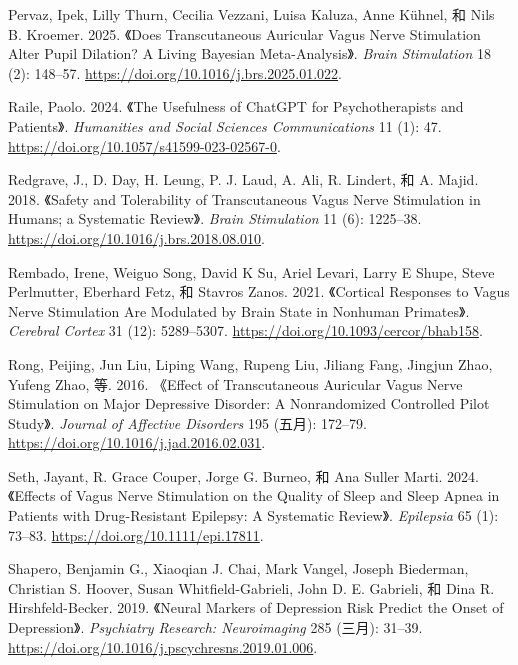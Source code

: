 \documentclass[
  Letterpaper,
]{scrbook}
\newlength{\cslhangindent}
\newenvironment{CSLReferences}[2] %
 {\begin{list}{}{%
  \setlength{\itemindent}{0pt}
  \setlength{\leftmargin}{0pt}
  \setlength{\parsep}{0pt}
  \ifodd #1
   \setlength{\leftmargin}{\cslhangindent}
   \setlength{\itemindent}{-1\cslhangindent}
  \fi
  \setlength{\itemsep}{#2\baselineskip}}}
 {\end{list}}
\begin{document}
\begin{CSLReferences}{1}{0}
Pervaz, Ipek, Lilly Thurn, Cecilia Vezzani, Luisa Kaluza, Anne Kühnel,
和 Nils B. Kroemer. 2025. {《Does Transcutaneous Auricular Vagus Nerve
Stimulation Alter Pupil Dilation? {A} Living {Bayesian}
Meta-Analysis》}. \emph{Brain Stimulation} 18 (2): 148--57.
\url{https://doi.org/10.1016/j.brs.2025.01.022}.

Raile, Paolo. 2024. {《The Usefulness of {ChatGPT} for Psychotherapists
and Patients》}. \emph{Humanities and Social Sciences Communications} 11
(1): 47. \url{https://doi.org/10.1057/s41599-023-02567-0}.

Redgrave, J., D. Day, H. Leung, P. J. Laud, A. Ali, R. Lindert, 和 A.
Majid. 2018. {《Safety and Tolerability of {Transcutaneous Vagus Nerve}
Stimulation in Humans; a Systematic Review》}. \emph{Brain Stimulation}
11 (6): 1225--38. \url{https://doi.org/10.1016/j.brs.2018.08.010}.

Rembado, Irene, Weiguo Song, David K Su, Ariel Levari, Larry E Shupe,
Steve Perlmutter, Eberhard Fetz, 和 Stavros Zanos. 2021. {《Cortical
{Responses} to {Vagus Nerve Stimulation Are Modulated} by {Brain State}
in {Nonhuman Primates}》}. \emph{Cerebral Cortex} 31 (12): 5289--5307.
\url{https://doi.org/10.1093/cercor/bhab158}.

Rong, Peijing, Jun Liu, Liping Wang, Rupeng Liu, Jiliang Fang, Jingjun
Zhao, Yufeng Zhao, 等. 2016. {《Effect of Transcutaneous Auricular Vagus
Nerve Stimulation on Major Depressive Disorder: {A} Nonrandomized
Controlled Pilot Study》}. \emph{Journal of Affective Disorders} 195
(五月): 172--79. \url{https://doi.org/10.1016/j.jad.2016.02.031}.

Seth, Jayant, R. Grace Couper, Jorge G. Burneo, 和 Ana Suller Marti.
2024. {《Effects of Vagus Nerve Stimulation on the Quality of Sleep and
Sleep Apnea in Patients with Drug-Resistant Epilepsy: {A} Systematic
Review》}. \emph{Epilepsia} 65 (1): 73--83.
\url{https://doi.org/10.1111/epi.17811}.

Shapero, Benjamin G., Xiaoqian J. Chai, Mark Vangel, Joseph Biederman,
Christian S. Hoover, Susan Whitfield-Gabrieli, John D. E. Gabrieli, 和
Dina R. Hirshfeld-Becker. 2019. {《Neural Markers of Depression Risk
Predict the Onset of Depression》}. \emph{Psychiatry Research:
Neuroimaging} 285 (三月): 31--39.
\url{https://doi.org/10.1016/j.pscychresns.2019.01.006}.


\end{CSLReferences}
\end{document}
